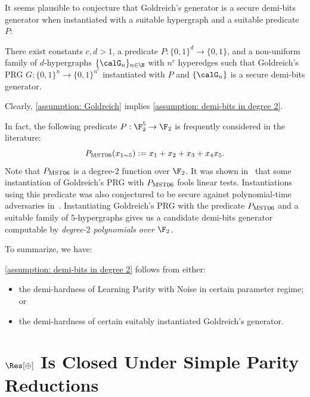 It seems plausible to conjecture that Goldreich's generator is a secure demi-bits generator when instantiated with a suitable hypergraph and a suitable predicate $P$:
\begin{assumption}\label{assumption: Goldreich}
    There exist constants $c, d > 1$, a predicate $P: \{0, 1\}^d \to \{0, 1\}$, and a non-uniform family of $d$-hypergraphs $\{\calG_n\}_{n\in\N}$ with $n^c$ hyperedges such that Goldreich's PRG $G: \{0, 1\}^n \to \{0, 1\}^{n^c}$ instantiated with $P$ and $\{\calG_n\}$ is a secure demi-bits generator.
\end{assumption}

Clearly, \autoref{assumption: Goldreich} implies \autoref{assumption: demi-bits in degree 2}.

In fact, the following predicate $P: \F_2^5\to \F_2$ is frequently considered in the literature:
\[P_{\rm MST06}(x_{1\sim 5}) := x_1 + x_2 + x_3 + x_4x_5.\]
Note that $P_{\rm MST06}$ is a degree-$2$ function over $\F_2$. It was shown in~\cite{DBLP:journals/rsa/MosselST06} that some instantiation of Goldreich's PRG with $P_{\rm MST06}$ fools linear tests. Instantiations using this predicate was also conjectured to be secure against polynomial-time adversaries in~\cite{DBLP:conf/tcc/BogdanovKR23}. Instantiating Goldreich's PRG with the predicate $P_{\rm MST06}$ and a suitable family of $5$-hypergraphs gives us a candidate demi-bits generator computable by \emph{degree-$2$ polynomials over $\F_2$}.





To summarize, we have:
\begin{proposition}[Informal]
    \autoref{assumption: demi-bits in degree 2} follows from either:\begin{itemize}
        \item the demi-hardness of Learning Parity with Noise in certain parameter regime; or
        \item the demi-hardness of certain suitably instantiated Goldreich's generator.
    \end{itemize}
\end{proposition}

\section{\texorpdfstring{$\Res[\oplus]$}{Res[2]} Is Closed Under Simple Parity Reductions}\label{sec: res parity}


